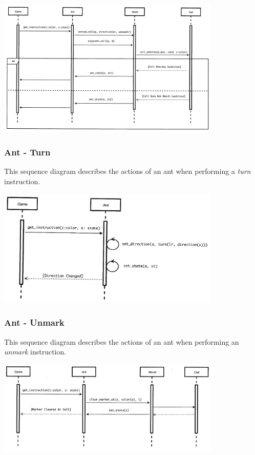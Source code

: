 \documentclass[11pt]{article}
\begin{document}
\begin{center}
\includegraphics[width=0.8\textwidth]{low-level-diagrams/sequence/ant-sense.png}
\end{center}

\subsubsection{Ant - Turn}

This sequence diagram describes the actions of an ant when performing a \textit{turn} instruction.

\begin{center}
\includegraphics[width=0.8\textwidth]{low-level-diagrams/sequence/ant-turn.png}
\end{center}

\subsubsection{Ant - Unmark}

This sequence diagram describes the actions of an ant when performing an \textit{unmark} instruction.

\begin{center}
\includegraphics[width=0.8\textwidth]{low-level-diagrams/sequence/ant-unmark.png}
\end{center}
\end{document}
